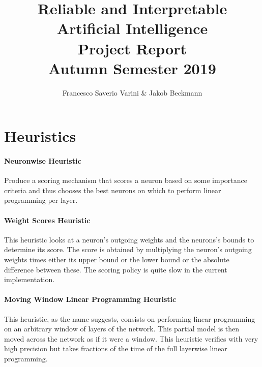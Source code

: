 \documentclass[11pt,a4paper]{article}
\begin{document}
\title{Reliable and Interpretable Artificial Intelligence\\ Project Report\\
 \normalsize{Autumn Semester 2019}}
\author{Francesco Saverio Varini \& Jakob Beckmann}

\section{Heuristics}

\paragraph{Neuronwise Heuristic}
Produce a scoring mechanism that scores a neuron based on some importance criteria and thus chooses the best neurons on which to perform linear programming per layer.

\paragraph{Weight Scores Heuristic}
This heuristic looks at a neuron's outgoing weights and the neurons's bounds to determine its score. The score is obtained by multiplying the neuron's outgoing weights times either its  upper bound or the lower bound or the absolute difference between these. The scoring policy is quite slow in the current implementation.

\paragraph{Moving Window Linear Programming Heuristic}
This heuristic, as the name suggests, consists on performing linear programming on an arbitrary window of layers of the network. This partial model is then moved across the network as if it were a window.
This heuristic verifies with very high precision but takes fractions of the time of the full layerwise linear programming.
\end{document}
